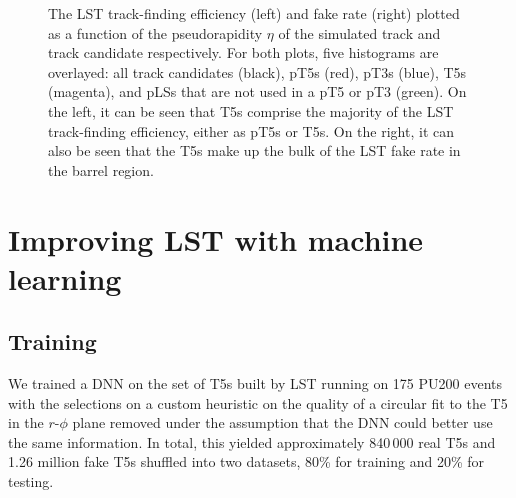 \begin{figure}[!htb]
    \centering
    \qquad
    \caption{
        The LST track-finding efficiency (left) and fake rate (right) plotted as a function of the pseudorapidity $\eta$ of the simulated track and track candidate respectively.
        For both plots, five histograms are overlayed: all track candidates (black), pT5s (red), pT3s (blue), T5s (magenta), and pLSs that are not used in a pT5 or pT3 (green).
        On the left, it can be seen that T5s comprise the majority of the LST track-finding efficiency, either as pT5s or T5s.
        On the right, it can also be seen that the T5s make up the bulk of the LST fake rate in the barrel region.
    }
    \label{fig:lst_performance}
\end{figure}

\section{Improving LST with machine learning}

\subsection{Training}
We trained a DNN on the set of T5s built by LST running on 175 \ttbar PU200 events with the selections on a custom heuristic on the quality of a circular fit to the T5 in the $r$-$\phi$ plane removed under the assumption that the DNN could better use the same information. 
In total, this yielded approximately 840\,000 real T5s and 1.26 million fake T5s shuffled into two datasets, 80\% for training and 20\% for testing. 

